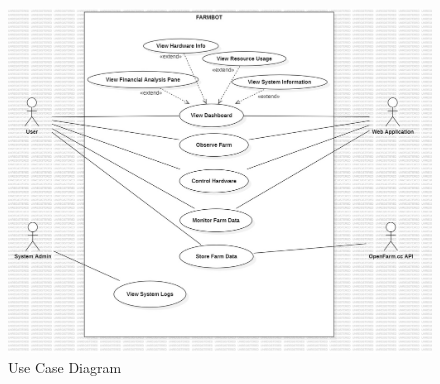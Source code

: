 \begin{figure}[htbp]
        \centering
        \includegraphics[width=1\linewidth]{Figures/use_case_diagram.jpg}
        \caption{Use Case Diagram}
        \label{UseCaseDiagram}
\end{figure}

\newpage

